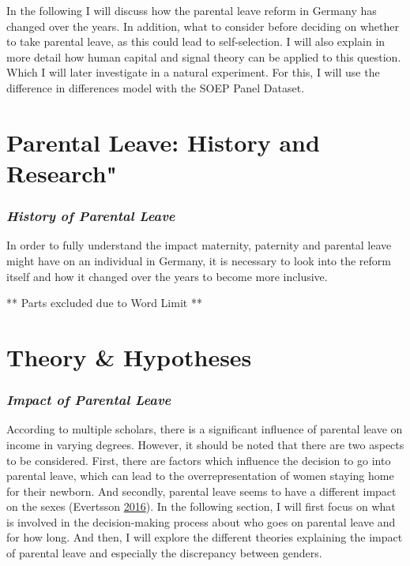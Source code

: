 \documentclass[
  11pt,
]{article}
\begin{document}
In the following I will discuss how the parental leave reform in Germany has changed over the years. In addition, what to consider before deciding on whether to take parental leave, as this could lead to self-selection. I will also explain in more detail how human capital and signal theory can be applied to this question. Which I will later investigate in a natural experiment. For this, I will use the difference in differences model with the SOEP Panel Dataset.

\hypertarget{parental-leave-history-and-research}{%
\section{Parental Leave: History and Research"}\label{parental-leave-history-and-research}}

\hypertarget{history-of-parental-leave}{%
\subsubsection*{\texorpdfstring{\emph{History of Parental Leave}}{History of Parental Leave}}\label{history-of-parental-leave}}

In order to fully understand the impact maternity, paternity and parental leave might have on an individual in Germany, it is necessary to look into the reform itself and how it changed over the years to become more inclusive.

** Parts excluded due to Word Limit **

\hypertarget{theory-hypotheses}{%
\section{Theory \& Hypotheses}\label{theory-hypotheses}}

\hypertarget{impact-of-parental-leave}{%
\subsubsection*{\texorpdfstring{\emph{Impact of Parental Leave}}{Impact of Parental Leave}}\label{impact-of-parental-leave}}

According to multiple scholars, there is a significant influence of parental leave on income in varying degrees.
However, it should be noted that there are two aspects to be considered. First, there are factors which influence the decision to go into parental leave, which can lead to the overrepresentation of women staying home for their newborn. And secondly, parental leave seems to have a different impact on the sexes (Evertsson \protect\hyperlink{ref-evertsson_parental_2016}{2016}). In the following section, I will first focus on what is involved in the decision-making process about who goes on parental leave and for how long. And then, I will explore the different theories explaining the impact of parental leave and especially the discrepancy between genders.
\end{document}
